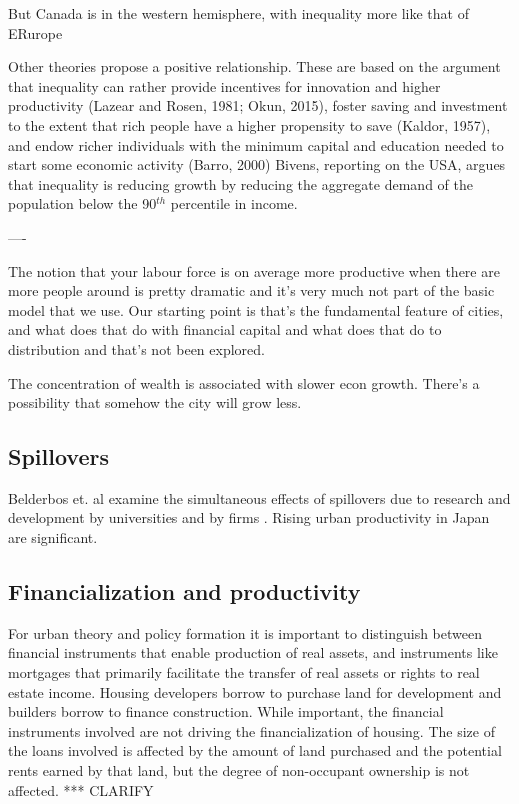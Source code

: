 But Canada is in the western hemisphere, with inequality more like that of ERurope 
 
 Other theories propose a positive relationship. These are based on the argument that inequality can rather provide incentives for innovation and higher productivity (Lazear and Rosen, 1981; Okun, 2015), foster saving and investment to the extent that rich people have a higher propensity to save (Kaldor, 1957), and endow richer individuals with the minimum capital and education needed to start some economic activity (Barro, 2000)
Bivens, reporting on the USA, argues that inequality is reducing growth by reducing the aggregate demand of the population below the 90$^{th}$ percentile in income.\cite{bivensInequalitySlowingUS2017} 



----


The notion that your labour force is on average more productive when there are more people around is pretty dramatic and it's very much not part of the basic model that we use. Our starting point is that's the fundamental feature of cities, and what does that do with financial capital and what does that do to distribution and that's not been explored. 

The concentration of wealth is associated with slower econ growth.  There's a possibility that somehow the city will grow less.


\subsection{Spillovers}
Belderbos et. al examine the simultaneous effects of spillovers due to research and development by universities and by firms \cite{belderbosWhatSpilloversUniversities2022}. Rising urban productivity in Japan are significant. 




\subsection{Financialization and productivity}

For urban theory and policy formation it is important to distinguish between financial instruments that enable production of real assets, and instruments like  mortgages that primarily facilitate the transfer of real assets or rights to real estate income. Housing developers borrow to purchase land for development and builders borrow to finance construction. While important, the financial instruments involved are not driving the financialization of housing.  The size of the loans involved is affected by the amount of land purchased and the potential rents earned by that land, but the degree of non-occupant ownership is not affected. *** CLARIFY

